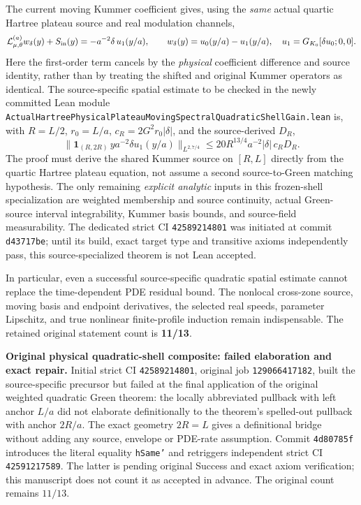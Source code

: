 \documentclass[11pt]{amsart}
\begin{document}
The current moving Kummer coefficient gives, using the \emph{same}
actual quartic Hartree plateau source and real modulation channels,
\[
 \mathcal L_{\mu,\theta}^{(a)}w_\delta(y)+S_{\rm in}(y)
       =-a^{-2}\delta\,u_1(y/a),\qquad
 w_\delta(y)=u_0(y/a)-u_1(y/a),\quad
 u_1=G_{K_0}[\delta u_0;0,0].
\]
Here the first-order term cancels by the \emph{physical} coefficient
difference and source identity, rather than by treating the shifted
and original Kummer operators as identical.
The source-specific spatial estimate to be checked in the newly
committed Lean module
\texttt{ActualHartreePhysicalPlateauMovingSpectralQuadraticShellGain.lean}
is, with $R=L/2$, $r_0=L/a$,
$c_R=2G^2r_0|\delta|$, and the source-derived $D_R$,
\[
 \bigl\|\mathbf1_{(R,2R)}\,y a^{-2}\delta u_1(y/a)
 \bigr\|_{L^{2,7/4}}
 \le 20R^{13/4} a^{-2}|\delta|\, c_R D_R.
\]
The proof must derive the shared Kummer source on $[R,L]$ directly
from the quartic Hartree plateau equation, not assume a second
source-to-Green matching hypothesis. The only remaining
\emph{explicit analytic} inputs in this frozen-shell specialization
are weighted membership and source continuity, actual Green-source
interval integrability, Kummer basis bounds, and source-field
measurability. The dedicated strict CI \texttt{42589214801}
was initiated at commit \texttt{d43717be}; until its build,
exact target type and transitive axioms independently pass,
this source-specialized theorem is not Lean accepted.

In particular, even a successful source-specific quadratic
spatial estimate cannot replace the time-dependent PDE residual
bound. The nonlocal cross-zone source, moving basis and endpoint
derivatives, the selected real speeds, parameter Lipschitz, and
true nonlinear finite-profile induction remain indispensable.
The retained original statement count is \textbf{11/13}.


\medskip
\noindent\textbf{Original physical quadratic-shell composite: failed elaboration and exact repair.}
Initial strict CI \texttt{42589214801}, original job
\texttt{129066417182}, built the source-specific precursor but
failed at the final application of the original weighted quadratic
Green theorem: the locally abbreviated pullback with left
anchor $L/a$ did not elaborate definitionally to the theorem's
spelled-out pullback with anchor $2R/a$.
The exact geometry $2R=L$ gives a definitional bridge
without adding any source, envelope or PDE-rate assumption.
Commit \texttt{4d80785f} introduces the literal equality
\texttt{hSame'} and retriggers independent strict
CI \texttt{42591217589}. The latter is pending original
Success and exact axiom verification; this manuscript does
not count it as accepted in advance. The original count
remains $11/13$.
\end{document}
